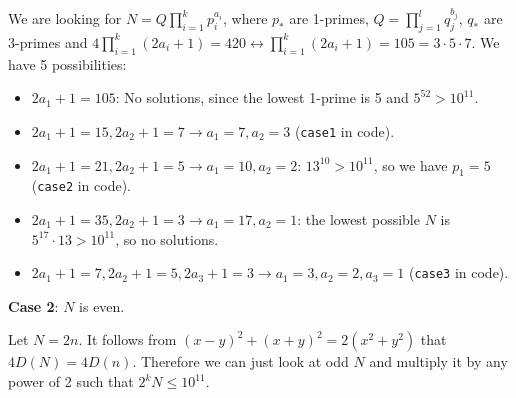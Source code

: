 \documentclass[a4paper,12pt]{article}
\begin{document}
We are looking for \(N = Q\prod_{i = 1}^k p_i^{a_i}\), where \(p_*\) are 1-primes, \(Q = \prod_{j = 1}^l q_j^{b_j}\), \(q_*\) are 3-primes and \(4\prod_{i = 1}^k(2a_i + 1) = 420 \leftrightarrow \prod_{i = 1}^k(2a_i + 1) = 105 = 3 \cdot 5 \cdot 7\). We have 5 possibilities:
\begin{itemize}
\item \(2a_1 + 1 = 105\): No solutions, since the lowest 1-prime is 5 and \(5^{52} > 10^{11}\).
\item \(2a_1 + 1 = 15, 2a_2 + 1 = 7 \rightarrow a_1 = 7, a_2 = 3\) (\texttt{case1} in code).
\item \(2a_1 + 1 = 21, 2a_2 + 1 = 5 \rightarrow a_1 = 10, a_2 = 2\): \(13^{10} > 10^{11}\), so we have \(p_1 = 5\) (\texttt{case2} in code).
\item \(2a_1 + 1 = 35, 2a_2 + 1 = 3 \rightarrow a_1 = 17, a_2 = 1\): the lowest possible \(N\) is \(5^{17} \cdot 13 > 10^{11}\), so no solutions.
\item \(2a_1 + 1 = 7, 2a_2 + 1 = 5, 2a_3 + 1 = 3 \rightarrow a_1 = 3, a_2 = 2, a_3 = 1\) (\texttt{case3} in code).
\end{itemize}

\textbf{Case 2}: \(N\) is even.

Let \(N = 2n\). It follows from \((x - y)^2 + (x + y)^2 = 2(x^2 + y^2)\) that \(4D(N) = 4D(n)\). Therefore we can just look at odd \(N\) and multiply it by any power of 2 such that \(2^kN \leq 10^{11}\).
\end{document}
